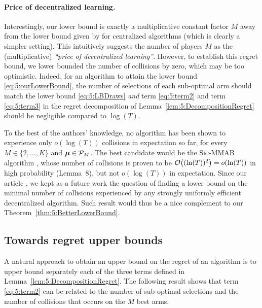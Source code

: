 \paragraph{Price of decentralized learning.}
%
Interestingly, our lower bound is exactly a multiplicative constant factor $M$ away from the lower bound given by \cite{Anantharam87a} for centralized algorithms (which is clearly a simpler setting). This intuitively suggests the number of players $M$ as the (multiplicative) \emph{``price of decentralized learning''}.
However, to establish this regret bound, we lower bounded the number of collisions by zero, which may be too optimistic.
%
Indeed, for an algorithm to attain the lower bound \eqref{eq:5:ourLowerBound}, the number of selections of each sub-optimal arm should match the lower bound \eqref{eq:5:LBDraws} \emph{and} term \ref{eq:5:term2} and term \ref{eq:5:term3} in the regret decomposition of Lemma~\ref{lem:5:DecompositionRegret} should be negligible compared to  $\log(T)$.

To the best of the authors' knowledge, no algorithm has been shown to experience only $o(\log(T))$ collisions in expectation so far,
for every $M \in \{2,\dots,K\}$ and $\boldsymbol{\mu} \in \mathcal{P}_M$.
The best candidate would be the \textsc{Sic-MMAB} algorithm \cite{BoursierPerchet18}, whose number of collisions is proven to be $\mathop{}\mathopen{}\mathcal{O}\mathopen{}\left((\ln(T))^2\right) = o(\ln(T))$ in high probability (Lemma~8), but not $o(\log(T))$ in expectation.
%
Since our article \cite{Besson2018ALT}, we kept as a future work the question
of finding a lower bound on the minimal number of collisions experienced by any strongly uniformly efficient decentralized algorithm.
Such result would thus be a nice complement to our Theorem~\ref{thm:5:BetterLowerBound}.


\subsection{Towards regret upper bounds}
\label{sub:5:towardsRegretUpperBounds}

A natural approach to obtain an upper bound on the regret of an algorithm is to upper bound separately each of the three terms defined in Lemma~\ref{lem:5:DecompositionRegret}.
The following result shows that term \ref{eq:5:term2} can be related to the number of sub-optimal selections and the number of collisions that occurs on the $M$ best arms.

